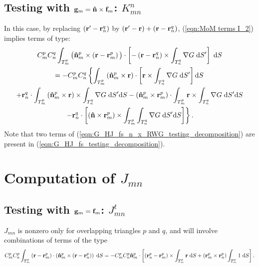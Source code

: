 \subsection{Testing with $\mathbf{g}_m = \mathbf{\Hat{n}} \times \mathbf{f}_m$: $K_{mn}^n$}
%
\par
In this case, by replacing $\left(\mathbf{r}'-\mathbf{r}_n^q \right)$ by $\left(\mathbf{r}'-\mathbf{r} \right) + \left(\mathbf{r}-\mathbf{r}_n^q \right)$, (\ref{eqn:MoM terms I_2}) implies terms of type:
\begin{multline} \label{eqn:G_HJ_fs_n_x_RWG_testing_decomposition}
C_m^p C_n^q \int_{T_m^p} \big( \mathbf{\Hat{n}}_m^p \times \left(\mathbf{r} - \mathbf{r}_m^p \right) \big) \cdot \left[-\left(\mathbf{r} - \mathbf{r}_n^q\right) \times \int_{T_n^q} \nabla G \; \text{d} S'\right] \; \text{d} S \\ 
= -C_m^p C_n^q \left\{ \int_{T_m^p} \left(\mathbf{\Hat{n}}_m^p \times \mathbf{r}\right) \cdot \left[\mathbf{r} \times \int_{T_n^q} \nabla G \; \text{d} S' \right] \text{d} S \right. \\
+ \mathbf{r}_n^q \cdot \int_{T_m^p} \left(\mathbf{\Hat{n}}_m^p \times \mathbf{r}\right) \times \int_{T_n^q} \nabla G \; \text{d} S' \text{d} S  - \left(\mathbf{\Hat{n}}_m^p\times\mathbf{r}_m^p \right) \cdot \int_{T_m^p} \mathbf{r} \times \int_{T_n^q} \nabla G \; \text{d} S' \text{d} S \\
\left. - \mathbf{r}_n^q \cdot \left[\left(\mathbf{\Hat{n}} \times \mathbf{r}_m^p \right) \times \int_{T_m^p} \int_{T_n^q}\nabla G \; \text{d} S' \text{d} S\right]\right\}.
\end{multline}
Note that two terms of (\ref{eqn:G_HJ_fs_n_x_RWG_testing_decomposition}) are present in (\ref{eqn:G_HJ_fs_testing_decomposition}).

\section{Computation of $J_{mn}$}

\subsection{Testing with $\mathbf{g}_m = \mathbf{f}_m$: $J_{mn}^t$}
%
\par
$J_{mn}$ is nonzero only for overlapping triangles $p$ and $q$, and will involve combinations of terms of the type
\begin{equation} \label{eqn:MMPIE_J_RWG_testing_diag_term}
C_m^p C_n^p \int_{T_m^p} \left(\mathbf{r}-\mathbf{r}_m^p\right) \cdot \left(\mathbf{\Hat{n}}_m^p \times \left(\mathbf{r}-\mathbf{r}_n^p\right) \right) \; \text{d} S =  - C_m^p C_n^p \mathbf{\Hat{n}}_m^p \cdot \left[\left(\mathbf{r}_n^p-\mathbf{r}_m^p\right) \times \int_{T_m^p} \mathbf{r} \; \text{d} S + \left(\mathbf{r}_m^p \times \mathbf{r}_n^p\right) \int_{T_m^p} 1 \; \text{d} S \right].
\end{equation}

